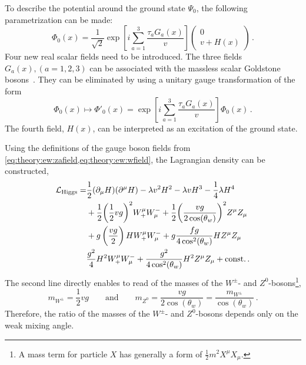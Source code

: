 To describe the potential around the ground state $\Psi_0$, the following parametrization can be made:
\begin{equation}
    \Phi_0 (x) = \frac{1}{\sqrt{2}} \exp \left[ i \sum_{a=1}^{3} \frac{\tau_a G_a(x)}{v} \right]
    \begin{pmatrix}
         0 \\ v + H(x)
    \end{pmatrix} \,.
\end{equation}
Four new real scalar fields need to be introduced.
The three fields $G_a(x), (a=1,2,3)$ can be associated with the massless scalar Goldstone bosons~\cite{GoldstoneBoson1,GoldstoneBoson2}.
They can be eliminated by using a unitary gauge transformation of the form
\begin{equation}
    \Phi_0(x) \mapsto \Phi'_0(x) = \exp \left[ i \sum_{a=1}^{3} \frac{\tau_a G_a(x)}{v} \right] \Phi_0(x) \,.
\end{equation}
The fourth field, $H(x)$, can be interpreted as an excitation of the ground state.

Using the definitions of the gauge boson fields from \cref{eq:theory:ew:zafield,eq:theory:ew:wfield}, the
Lagrangian density can be constructed,
\begin{equation}
    \begin{split}
        \mathcal{L}_\text{Higgs} =& \frac{1}{2} (\partial_\mu H)(\partial^\mu H) - \lambda v^2 H^2 - \lambda v H^3 - \frac{1}{4} \lambda H^4 \\
        & + \frac{1}{2} {\left(\frac{1}{2} v g \right)}^2 W^\mu_+ W^-_\mu + \frac{1}{2} {\left(\frac{v g}{2 \cos (\theta_w)}\right)}^2 Z^\mu Z_\mu \\
        & + g \left(\frac{v g }{2}\right) H W^\mu_+ W^-_\mu + g \frac{f g}{4 \cos^2 (\theta_w)} H Z^\mu Z_\mu \\
        & \frac{g^2}{4} H^2 W^\mu_+ W^-_\mu + \frac{g^2}{4 \cos^2 (\theta_w)} H^2 Z^\mu Z_\mu + \text{const}.  \,.
    \end{split}
\end{equation}
The second line directly enables to read of the masses of the $W^\pm$- and $Z^0$-bosons\footnote{A mass term for particle $X$ has generally a form of $\frac{1}{2}m^2 X^\mu X_\mu$.},
\begin{equation}
    m_{W^\pm} = \frac{1}{2} v g \qquad \text{and} \qquad m_{Z^0} = \frac{v g }{2 \cos(\theta_w)} = \frac{m_{W^\pm}}{\cos(\theta_w)} \,.
\end{equation}
Therefore, the ratio of the masses of the $W^\pm$- and $Z^0$-bosons depends only on the weak mixing angle.


